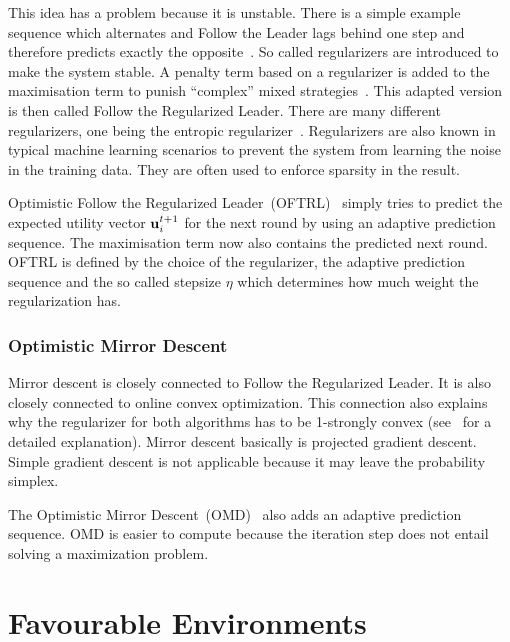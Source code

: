 \documentclass[a4paper]{article}
\theoremstyle{definition}
\renewcommand{\vec}[1]{\ensuremath{{\bf #1}}}
\begin{document}
This idea has a problem because it is unstable.
There is a simple example sequence which alternates and Follow the
Leader lags behind one step and therefore predicts exactly the
opposite~\cite[p.127, Example 2.2]{Foundations}.
So called regularizers are introduced to make the system stable.
A penalty term based on a regularizer is added to the
maximisation term to punish \enquote{complex}
mixed strategies~\cite[p.89]{schoelkopf2002learning}.
This adapted version is then called Follow the Regularized Leader.
There are many different regularizers, one being the entropic
regularizer~\cite[p.136, Example 2.5]{Foundations}.
Regularizers are also known in typical machine learning scenarios to
prevent the system from learning the noise in the training data.
They are often used to enforce sparsity in the result.

Optimistic Follow the Regularized Leader~(OFTRL)~\cite{OMD} simply tries to predict the
expected utility vector $\vec{u}_i^{t+1}$ for the next round by using
an adaptive prediction sequence.
The maximisation term now also contains the
predicted next round.
OFTRL is defined by the choice of the regularizer, the adaptive
prediction sequence and the so called stepsize $\eta$ which determines how
much weight the regularization has.


\subsubsection{Optimistic Mirror Descent}
\label{sec:optim-mirr-desc}

Mirror descent is closely connected to Follow the Regularized Leader.
It is also closely connected to online convex optimization.
This connection also explains why the regularizer for both algorithms
has to be 1-strongly convex (see~\cite{Foundations} for a detailed explanation).
Mirror descent basically is projected gradient descent.
Simple gradient descent is not applicable because it may leave the
probability simplex.


The Optimistic Mirror Descent~(OMD)~\cite[]{OMD} also adds an adaptive prediction sequence.
OMD is easier to compute because the iteration step does not entail
solving a maximization problem.





\section{Favourable Environments}
\label{sec:favo-envir}
\end{document}
